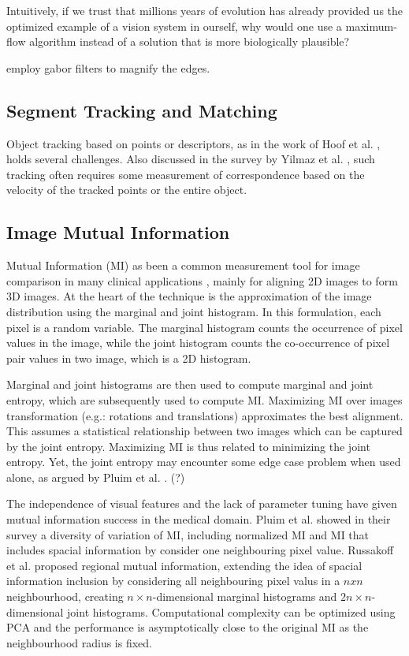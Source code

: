 \documentclass{article}
\begin{document}
Intuitively, if we trust that millions years of evolution has already provided us the optimized example of a vision system in ourself, why would one use a maximum-flow algorithm instead of a solution that is more biologically plausible?

employ gabor filters \cite{gabor} to magnify the edges. 


\subsection{Segment Tracking and Matching}

Object tracking based on points or descriptors, as in the work of Hoof et al. \cite{Herke}, holds several challenges. Also discussed in the survey by Yilmaz et al. \cite{tracking}, such tracking often requires some measurement of correspondence based on the velocity of the tracked points or the entire object. 

\subsection{Image Mutual Information}

Mutual Information (MI) as been a common measurement tool for image comparison in many clinical applications \cite{mi}, mainly for aligning 2D images to form 3D images. At the heart of the technique is the approximation of the image distribution using the marginal and joint histogram. In this formulation, each pixel is a random variable. The marginal histogram counts the occurrence of pixel values in the image, while the joint histogram counts the co-occurrence of pixel pair values in two image, which is a 2D histogram. 

Marginal and joint histograms are then used to compute marginal and joint entropy, which are subsequently used to compute MI. Maximizing MI over images transformation (e.g.: rotations and translations) approximates the best alignment. This assumes a statistical relationship between two images which can be captured by the joint entropy. Maximizing MI is thus related to minimizing the joint entropy. Yet, the joint entropy may encounter some edge case problem when used alone, as argued by Pluim et al. \cite{mi}. (?)

The independence of visual features and the lack of parameter tuning have given mutual information success in the medical domain. Pluim et al. showed in their survey a diversity of variation of MI, including normalized MI and MI that includes spacial information by consider one neighbouring pixel value. Russakoff et al. \cite{rmi} proposed regional mutual information, extending the idea of spacial information inclusion by considering all neighbouring pixel valus in a $nxn$ neighbourhood, creating $n\times n$-dimensional marginal histograms and $2n\times n$-dimensional joint histograms. Computational complexity can be optimized using PCA and the performance is asymptotically close to the original MI as the neighbourhood radius is fixed. 
\end{document}

